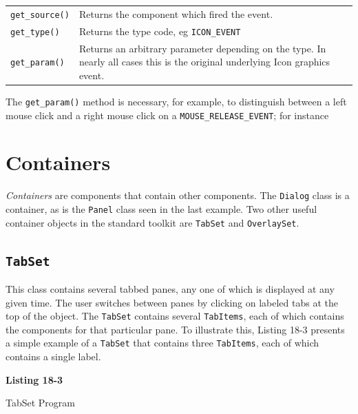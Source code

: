 \vspace{0.15in}
\begin{supertabular}{m{1.2in} m{4.7in}}
\texttt{get\_source()} & Returns the component which fired the event.\\
\texttt{get\_type()} & Returns the type code, eg \texttt{ICON\_EVENT}\\
\texttt{get\_param()} &
Returns an arbitrary parameter depending on the type. In
nearly all cases this is the original underlying Icon graphics event.\\
\end{supertabular}
\vspace{0.15in}

The \texttt{get\_param()} method is necessary, for example, to
distinguish between a left mouse click and a right mouse click on a
\texttt{MOUSE\_RELEASE\_EVENT}; for instance 


\section{Containers}

\textit{Containers} are components that contain other components.
The \texttt{Dialog} class is a container, as is
the \texttt{Panel} class seen in the last example.
Two other useful container objects in the standard toolkit are \texttt{TabSet}
and \texttt{OverlaySet}.

\subsection*{\texttt{TabSet}}

This class contains several tabbed panes, any one of which
is displayed at any given time. The user switches between panes by clicking on
labeled tabs at the top of the object. The \texttt{TabSet} contains several
\texttt{TabItems}, each of which contains the components for that particular
pane. To illustrate this, Listing 18-3 presents a simple example of a
\texttt{TabSet} that contains three \texttt{TabItems}, each of which contains a
single label.

\bigskip

{\sffamily\bfseries
Listing 18-3

TabSet Program}

